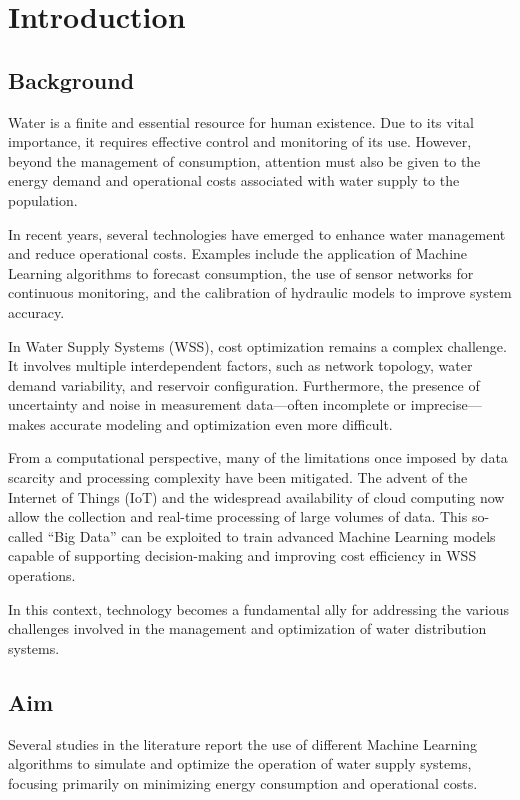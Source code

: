 \chapter{Introduction}

\section{Background}

Water is a finite and essential resource for human existence. Due to its vital importance, it requires effective control and monitoring of its use. However, beyond the management of consumption, attention must also be given to the energy demand and operational costs associated with water supply to the population.

In recent years, several technologies have emerged to enhance water management and reduce operational costs. Examples include the application of Machine Learning algorithms to forecast consumption, the use of sensor networks for continuous monitoring, and the calibration of hydraulic models to improve system accuracy.

In Water Supply Systems (WSS), cost optimization remains a complex challenge. It involves multiple interdependent factors, such as network topology, water demand variability, and reservoir configuration. Furthermore, the presence of uncertainty and noise in measurement data—often incomplete or imprecise—makes accurate modeling and optimization even more difficult.

From a computational perspective, many of the limitations once imposed by data scarcity and processing complexity have been mitigated. The advent of the Internet of Things (IoT) and the widespread availability of cloud computing now allow the collection and real-time processing of large volumes of data. This so-called “Big Data” can be exploited to train advanced Machine Learning models capable of supporting decision-making and improving cost efficiency in WSS operations.

In this context, technology becomes a fundamental ally for addressing the various challenges involved in the management and optimization of water distribution systems.

\section{Aim}

Several studies in the literature report the use of different Machine Learning algorithms to simulate and optimize the operation of water supply systems, focusing primarily on minimizing energy consumption and operational costs.

